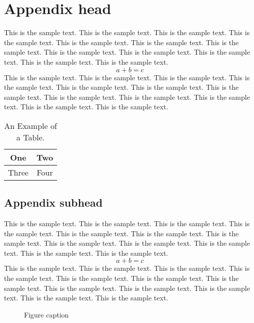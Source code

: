 \documentclass[preprint]{ptephy_v1}%
\begin{document}
\appendix

\section{Appendix head}

This is the sample text. This is the sample text. This is the sample text. This is the sample text.
This is the sample text. This is the sample text. This is the sample text. This is the sample text.
This is the sample text. This is the sample text. This is the sample text. This is the sample text.
\begin{equation}
a + b = c
\end{equation}
This is the sample text. This is the sample text. This is the sample text. This is the sample text.
This is the sample text. This is the sample text. This is the sample text. This is the sample text.
This is the sample text. This is the sample text. This is the sample text. This is the sample text.

\begin{table}[!h]
\caption{An Example of a Table.}%
\label{table_example}
\centering
\begin{tabular}{|c||c|}%
\hline
One & Two\\ %
\hline
Three & Four\\%
\hline
\end{tabular}
\end{table}%

\subsection{Appendix subhead}
This is the sample text. This is the sample text. This is the sample text. This is the sample text.
This is the sample text. This is the sample text. This is the sample text. This is the sample text.
This is the sample text. This is the sample text. This is the sample text. This is the sample text.
\begin{equation}
a + b = c
\end{equation}
This is the sample text. This is the sample text. This is the sample text. This is the sample text.
This is the sample text. This is the sample text. This is the sample text. This is the sample text.
This is the sample text. This is the sample text. This is the sample text. This is the sample text.

\begin{figure}[!h]
\caption{Figure caption}
\end{figure}
\end{document}
